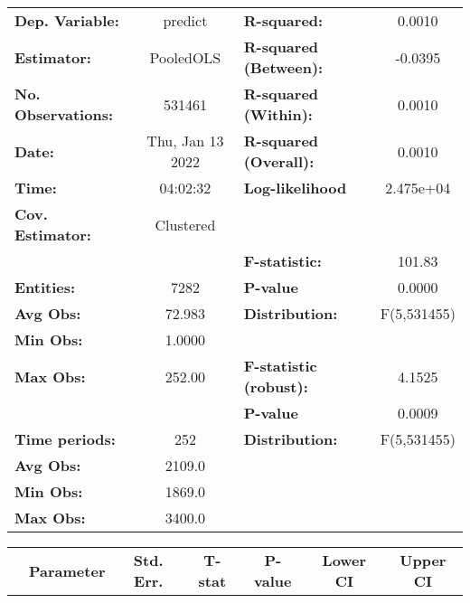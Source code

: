 \begin{center}
\begin{tabular}{lclc}
\toprule
\textbf{Dep. Variable:}    &      predict       & \textbf{  R-squared:         }   &      0.0010      \\
\textbf{Estimator:}        &     PooledOLS      & \textbf{  R-squared (Between):}  &     -0.0395      \\
\textbf{No. Observations:} &       531461       & \textbf{  R-squared (Within):}   &      0.0010      \\
\textbf{Date:}             &  Thu, Jan 13 2022  & \textbf{  R-squared (Overall):}  &      0.0010      \\
\textbf{Time:}             &      04:02:32      & \textbf{  Log-likelihood     }   &    2.475e+04     \\
\textbf{Cov. Estimator:}   &     Clustered      & \textbf{                     }   &                  \\
\textbf{}                  &                    & \textbf{  F-statistic:       }   &      101.83      \\
\textbf{Entities:}         &        7282        & \textbf{  P-value            }   &      0.0000      \\
\textbf{Avg Obs:}          &       72.983       & \textbf{  Distribution:      }   &   F(5,531455)    \\
\textbf{Min Obs:}          &       1.0000       & \textbf{                     }   &                  \\
\textbf{Max Obs:}          &       252.00       & \textbf{  F-statistic (robust):} &      4.1525      \\
\textbf{}                  &                    & \textbf{  P-value            }   &      0.0009      \\
\textbf{Time periods:}     &        252         & \textbf{  Distribution:      }   &   F(5,531455)    \\
\textbf{Avg Obs:}          &       2109.0       & \textbf{                     }   &                  \\
\textbf{Min Obs:}          &       1869.0       & \textbf{                     }   &                  \\
\textbf{Max Obs:}          &       3400.0       & \textbf{                     }   &                  \\
\bottomrule
\end{tabular}
\begin{tabular}{lcccccc}
                & \textbf{Parameter} & \textbf{Std. Err.} & \textbf{T-stat} & \textbf{P-value} & \textbf{Lower CI} & \textbf{Upper CI}  \\

\end{tabular}
\end{center}
